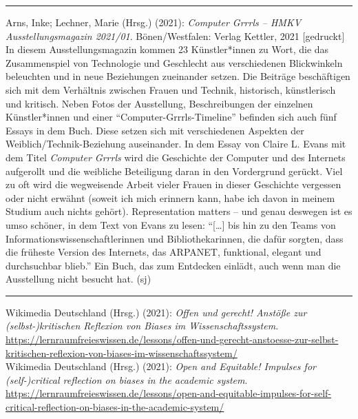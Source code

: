 \documentclass[a4paper,
fontsize=11pt,
oneside,
numbers=noperiodatend,
parskip=half-,
bibliography=totoc,
final
]{scrartcl}
\begin{document}
\begin{center}\rule{0.5\linewidth}{0.5pt}\end{center}

Arns, Inke; Lechner, Marie (Hrsg.) (2021): \emph{Computer Grrrls -- HMKV
Ausstellungsmagazin 2021/01}. Bönen/Westfalen: Verlag Kettler, 2021
{[}gedruckt{]}\\
In diesem Ausstellungsmagazin kommen 23 Künstler*innen zu Wort, die das
Zusammenspiel von Technologie und Geschlecht aus verschiedenen
Blickwinkeln beleuchten und in neue Beziehungen zueinander setzen. Die
Beiträge beschäftigen sich mit dem Verhältnis zwischen Frauen und
Technik, historisch, künstlerisch und kritisch. Neben Fotos der
Ausstellung, Beschreibungen der einzelnen Künstler*innen und einer
\enquote{Computer-Grrrls-Timeline} befinden sich auch fünf Essays in dem
Buch. Diese setzen sich mit verschiedenen Aspekten der
Weiblich/Technik-Beziehung auseinander. In dem Essay von Claire L. Evans
mit dem Titel \emph{Computer Grrrls} wird die Geschichte der Computer
und des Internets aufgerollt und die weibliche Beteiligung daran in den
Vordergrund gerückt. Viel zu oft wird die wegweisende Arbeit vieler
Frauen in dieser Geschichte vergessen oder nicht erwähnt (soweit ich
mich erinnern kann, habe ich davon in meinem Studium auch nichts
gehört). Representation matters -- und genau deswegen ist es umso
schöner, in dem Text von Evans zu lesen: \enquote{[\ldots] bis hin zu den
Teams von Informationswissenschaftlerinnen und Bibliothekarinnen, die
dafür sorgten, dass die früheste Version des Internets, das ARPANET,
funktional, elegant und durchsuchbar blieb.} Ein Buch, das zum
Entdecken einlädt, auch wenn man die Ausstellung nicht besucht hat. (sj)

\begin{center}\rule{0.5\linewidth}{0.5pt}\end{center}
\pagebreak

Wikimedia Deutschland (Hrsg.) (2021): \emph{Offen und gerecht! Anstöße
zur (selbst-)kritischen Reflexion von Biases im Wissenschaftssystem}.
\url{https://lernraumfreieswissen.de/lessons/offen-und-gerecht-anstoesse-zur-selbst-kritischen-reflexion-von-biases-im-wissenschaftssystem/}\\
Wikimedia Deutschland (Hrsg.) (2021): \emph{Open and Equitable! Impulses
for (self-)critical reflection on biases in the academic system}.
\url{https://lernraumfreieswissen.de/lessons/open-and-equitable-impulses-for-self-critical-reflection-on-biases-in-the-academic-system/}\\
\end{document}
